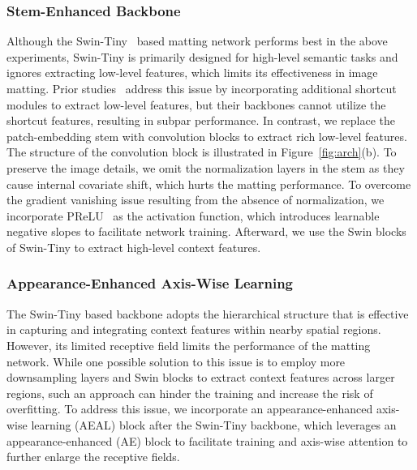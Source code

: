 \documentclass[10pt,twocolumn,letterpaper]{article}
\begin{document}
\subsubsection{Stem-Enhanced Backbone}
Although the Swin-Tiny~\cite{liu2021Swin} based matting network performs best in the above experiments, Swin-Tiny is primarily  designed for high-level semantic tasks and ignores extracting low-level features, which limits its effectiveness in image matting. 
Prior studies~\cite{park2022matteformer,dai2022boosting} address this issue by incorporating additional shortcut modules to extract low-level features, but their backbones cannot utilize the shortcut features, resulting in subpar performance. 
In contrast, we replace the patch-embedding stem with convolution blocks to extract rich low-level features.
The structure of the convolution block is illustrated in Figure~\ref{fig:arch}(b).
To preserve the image details, we omit the normalization layers in the stem as they cause internal covariate shift, which hurts the matting performance. 
To overcome the gradient vanishing issue resulting from the absence of normalization, we incorporate PReLU~\cite{he2015delving} as the activation function, which introduces learnable negative  slopes to facilitate network training.
Afterward, we use the Swin blocks of Swin-Tiny to extract high-level context features.


\subsubsection{Appearance-Enhanced Axis-Wise Learning}
The Swin-Tiny based backbone adopts the hierarchical structure that is effective in capturing and integrating context features within nearby spatial regions.
However, its limited receptive field limits the performance of the matting network. 
While one possible solution to this issue is to employ more downsampling layers and Swin blocks to extract context features across larger regions, such an approach can hinder the training and increase the risk of overfitting.
To address this issue, we incorporate an appearance-enhanced axis-wise learning  (AEAL) block after the Swin-Tiny backbone, which leverages an appearance-enhanced (AE) block to facilitate training and axis-wise attention to further enlarge the receptive fields.
\end{document}
